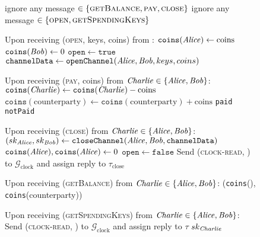 \begin{figure}[H]
  \begin{systembox}{\chanfunc}
    \begin{algorithmic}[1]
        \State ignore any message $\in \{\textsc{getBalance}, \textsc{pay},
        \textsc{close}\}$
      \Else
        \State ignore any message $\in \{\textsc{open},
        \textsc{getSpendingKeys}\}$
      \EndIf
      \Statex

      \State Upon receiving (\textsc{open}, keys, coins) from \alice:
      \Indent
        \State $\mathtt{coins}(\mathit{Alice}) \gets \mathrm{coins}$
        \State $\mathtt{coins}(\mathit{Bob}) \gets 0$
        \State $\mathtt{open} \gets \mathtt{true}$
        \State $\mathtt{channelData} \gets \mathtt{openChannel}(\mathit{Alice}, \mathit{Bob},
        keys, coins)$ 
      \EndIndent
      \Statex

      \State Upon receiving (\textsc{pay}, coins) from $\mathit{Charlie} \in \{\mathit{Alice},
      \mathit{Bob}\}$:
      \Indent
          \State $\mathtt{coins}(\mathit{Charlie}) \gets \mathtt{coins}(\mathit{Charlie}) -
          \mathrm{coins}$
          \State $\mathtt{coins}(\mathrm{counterparty}) \gets
          \mathtt{coins}(\mathrm{counterparty}) + \mathrm{coins}$
          \State \Return \texttt{paid}
        \Else
          \State \Return \texttt{notPaid}
        \EndIf
      \EndIndent
      \Statex

      \State Upon receiving (\textsc{close}) from $\mathit{Charlie} \in \{\mathit{Alice},
      \mathit{Bob}\}$:
      \Indent
        \State $(sk_{\mathit{Alice}}, sk_{\mathit{Bob}}) \gets \mathtt{closeChannel}(\mathit{Alice},
        \mathit{Bob}, \mathtt{channelData})$ 
        \State $\mathtt{coins}(\mathit{Alice}), \mathtt{coins}(\mathit{Alice}) \gets 0$
        \State $\mathtt{open} \gets \mathtt{false}$
        \State Send (\textsc{clock-read}, \chanfunc) to
        $\mathcal{G}_{\mathrm{clock}}$ and assign reply to
        $\tau_{\mathrm{close}}$
      \EndIndent
      \Statex

      \State Upon receiving (\textsc{getBalance}) from $\mathit{Charlie} \in \{\mathit{Alice},
      \mathit{Bob}\}$:
      \Indent
        \State \Return (\texttt{coins}(\charlie), \texttt{coins}(counterparty))
      \EndIndent
      \Statex

      \State Upon receiving (\textsc{getSpendingKeys}) from $\mathit{Charlie} \in \{\mathit{Alice},
      \mathit{Bob}\}$:
      \Indent
        \State Send (\textsc{clock-read}, \chanfunc) to
        $\mathcal{G}_{\mathrm{clock}}$ and assign reply to $\tau$
          \State \Return $sk_{\mathit{Charlie}}$
        \EndIf
      \EndIndent
    \end{algorithmic}
  \end{systembox}
  \caption{}
  \label{alg:chanfunc}
\end{figure}
